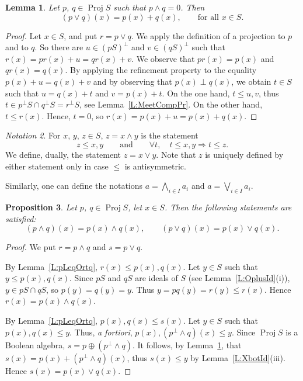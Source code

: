 \documentclass[psamsfonts,reqno]{memo-l}
\theoremstyle{plain}
\newtheorem{lemma}{Lemma}[section]
\newtheorem{proposition}[lemma]{Proposition}
\theoremstyle{definition}
\theoremstyle{remark}
\newtheorem{notation}[lemma]{Notation}
\numberwithin{equation}{section}
\DeclareMathOperator{\BB}{Proj}
\begin{document}
\begin{lemma}\label{L:JoinDisj}
Let $p$, $q\in\BB{S}$ such that $p\wedge q=0$. Then
   \[
   (p\vee q)(x)=p(x)+q(x),\qquad\text{for all }x\in S.
   \]
\end{lemma}

\begin{proof}
Let $x\in S$, and put $r=p\vee q$.
We apply the definition of a projection to $p$ and to $q$. So there are
$u\in(pS)^\bot$ and $v\in(qS)^\bot$ such that
$r(x)=pr(x)+u=qr(x)+v$. We observe that $pr(x)=p(x)$ and $qr(x)=q(x)$.
By applying the refinement property to the equality $p(x)+u=q(x)+v$ and by
observing that $p(x)\perp q(x)$, we obtain $t\in S$ such that $u=q(x)+t$
and $v=p(x)+t$. On the one hand, $t\leq u,v$, thus
$t\in p^\bot S\cap q^\bot S=r^\bot S$, see Lemma~\ref{L:MeetCompPr}. On
the other hand, $t\leq r(x)$. Hence, $t=0$, so $r(x)=p(x)+u=p(x)+q(x)$.
\end{proof}

\begin{notation}\label{Not:WeVe}
For $x$, $y$, $z\in S$, $z=x\wedge y$ is the statement
   \[
   z\leq x,y\qquad\text{and}\qquad
   \forall t,\quad t\leq x,y\Rightarrow t\leq z.
   \]
We define, dually, the statement $z=x\vee y$. Note that $z$ is uniquely
defined by either statement only in case $\leq$ is antisymmetric.

Similarly, one can define the notations $a=\bigwedge_{i\in I}a_i$ and
$a=\bigvee_{i\in I}a_i$.
\end{notation}

\begin{proposition}\label{P:pvwq(x)}
Let\index{pzzroj@$\BB{S}$} $p$, $q\in\BB{S}$, let $x\in S$. Then the
following statements are satisfied:
   \[
   (p\wedge q)(x)=p(x)\wedge q(x),\qquad
   (p\vee q)(x)=p(x)\vee q(x).
   \]
\end{proposition}

\begin{proof}
We put $r=p\wedge q$ and $s=p\vee q$.

By Lemma~\ref{L:pLeqOrtq}, $r(x)\leq p(x),q(x)$.
Let $y\in S$ such that $y\leq p(x),q(x)$. Since $pS$ and $qS$ are ideals of
$S$ (see Lemma~\ref{L:OplusId}(i)), $y\in pS\cap qS$, so $p(y)=q(y)=y$. Thus
$y=pq(y)=r(y)\leq r(x)$. Hence $r(x)=p(x)\wedge q(x)$.

By Lemma~\ref{L:pLeqOrtq}, $p(x),q(x)\leq s(x)$.
Let $y\in S$ such that $p(x),q(x)\leq y$.
Thus, \emph{a fortiori}, $p(x),(p^\bot\wedge q)(x)\leq y$.
Since $\BB{S}$\index{pzzroj@$\BB{S}$} is a Boolean algebra,
$s=p\oplus(p^\bot\wedge q)$.
It follows, by Lemma~\ref{L:JoinDisj}, that
$s(x)=p(x)+(p^\bot\wedge q)(x)$, thus $s(x)\leq y$ by
Lemma~\ref{L:XbotId}(iii). Hence $s(x)=p(x)\vee q(x)$.
\end{proof}
\end{document}

